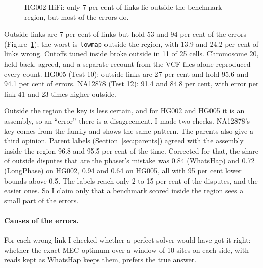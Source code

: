 \documentclass[11pt]{article}
\newcommand{\grp}[1]{\texttt{#1}}
\begin{document}
\begin{figure}[h]
\centering
{}
\caption{HG002 HiFi: only 7 per cent of links lie outside the benchmark
region, but most of the errors do.}
\label{fig:outside}
\end{figure}

Outside links are 7 per cent of links but hold 53 and 94 per cent of the
errors (Figure~\ref{fig:outside}); the worst is \grp{lowmap} outside the region, with 13.9 and 24.2 per
cent of links wrong. Cutoffs tuned inside broke outside in 11 of 25 cells.
Chromosome 20, held back, agreed, and a separate recount from the VCF files
alone reproduced every count. HG005 (Test
10): outside links are 27 per cent and hold 95.6 and 94.1 per cent of errors.
NA12878 (Test 12): 91.4 and 84.8 per cent, with error per link 41 and 23
times higher outside.

Outside the region the key is less certain, and for HG002 and HG005 it is an
assembly, so an \enquote{error} there is a disagreement. I made two checks.
NA12878's key comes from the family and shows the same pattern. The parents
also give a third opinion. Parent labels (Section~\ref{sec:parents}) agreed with the
assembly inside the region 96.8 and 95.5 per cent of the time. Corrected for
that, the share of outside disputes that are the phaser's mistake was 0.84
(WhatsHap) and 0.72 (LongPhase) on HG002, 0.94 and 0.64 on HG005, all with
95 per cent lower bounds above 0.5. The labels reach only 2 to
15 per cent of the disputes, and the easier ones. So I claim only that a
benchmark scored inside the region sees a small part of the errors.

\paragraph{Causes of the errors.} For each wrong link I checked whether a
perfect solver would have got it right: whether the exact MEC optimum over a
window of 10 sites on each side, with reads kept as WhatsHap keeps them,
prefers the true answer.
\end{document}
